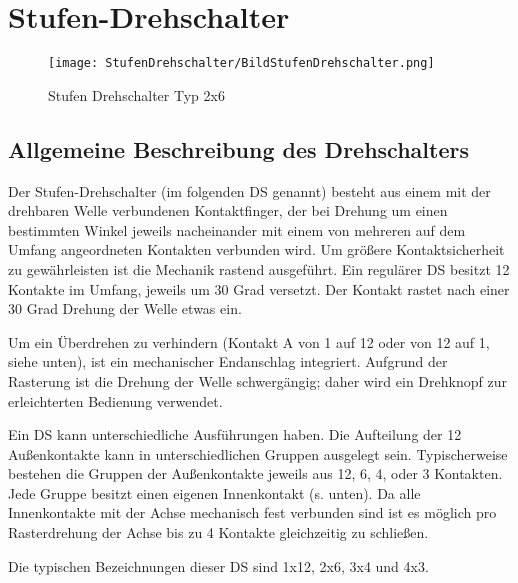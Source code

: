 %
%
\usepackage{comment}
\usepackage{graphicx}

\chapter{Stufen-Drehschalter}

\begin{figure}[H]
	\centering
	\texttt{[image: StufenDrehschalter/BildStufenDrehschalter.png]}
	\caption{Stufen Drehschalter Typ 2x6}
	\label{fig:BildStufenDrehschalter}
\end{figure}

\section{Allgemeine Beschreibung des Drehschalters}

Der Stufen-Drehschalter (im folgenden DS genannt) besteht aus einem mit der drehbaren Welle verbundenen Kontaktfinger, der bei Drehung um einen bestimmten Winkel jeweils nacheinander mit einem von mehreren auf dem Umfang angeordneten Kontakten verbunden wird. Um größere Kontaktsicherheit zu gewährleisten ist die Mechanik rastend ausgeführt. Ein regulärer DS besitzt  12 Kontakte im Umfang, jeweils um 30 Grad versetzt. Der Kontakt rastet nach einer 30 Grad Drehung der Welle etwas ein. 

Um ein Überdrehen zu verhindern (Kontakt A von 1 auf 12 oder von 12 auf 1, siehe unten), ist ein mechanischer Endanschlag integriert. Aufgrund der Rasterung ist die Drehung der Welle schwergängig; daher wird ein Drehknopf zur erleichterten Bedienung verwendet.
 


Ein DS kann unterschiedliche Ausführungen haben. Die Aufteilung der 12 Außenkontakte kann in unterschiedlichen Gruppen ausgelegt sein. Typischerweise bestehen die Gruppen der Außenkontakte jeweils aus 12, 6, 4, oder 3 Kontakten. Jede Gruppe besitzt einen eigenen Innenkontakt (s. unten). Da alle Innenkontakte mit der Achse mechanisch fest verbunden sind ist es möglich pro Rasterdrehung der Achse bis zu 4 Kontakte gleichzeitig zu schließen. 

Die typischen Bezeichnungen dieser DS sind 1x12, 2x6, 3x4 und 4x3. 


